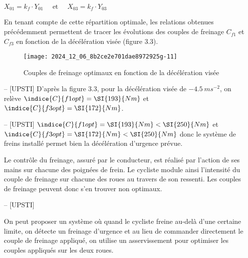 $
X_{01}=k_{f} \cdot Y_{01} \quad \text { et } \quad X_{03}=k_{f} \cdot Y_{03}
$

En tenant compte de cette répartition optimale, les relations obtenues précédemment permettent de tracer les évolutions des couples de freinage \(C_{f 1}\) et \(C_{f 3}\) en fonction de la décélération visée (figure 3.3).\\

\begin{figure}[!htb]
\begin{center}
\texttt{[image: 2024\_12\_06\_8b2ce2e701dae8972925g-11]}
\caption{Couples de freinage optimaux en fonction de la décélération visée \label{fig6}}
\end{center}
\end{figure}
\fi

\ifprof
\begin{corrige}-- [UPSTI]
D’après la figure 3.3, pour la décélération visée de $\SI{-4,5}{m s^{-2}}$, on relève $\indice{C}{f1opt}=\SI{193}{Nm}$ et 
$\indice{C}{f3opt}=\SI{172}{Nm}$.
\end{corrige}
\else
\fi

\ifprof
\begin{corrige}-- [UPSTI]
$\indice{C}{f1opt}=  \SI{193}{Nm}<\SI{250}{Nm}$ et $\indice{C}{f3opt}=\SI{172}{Nm}<\SI{250}{Nm}$ donc le système de freins installé permet bien la décélération d’urgence prévue.
\end{corrige}
\else
\fi

Le contrôle du freinage, assuré par le conducteur, est réalisé par l'action de ses mains sur chacune des poignées de frein. Le cycliste module ainsi l'intensité du couple de freinage sur chacune des roues au travers de son ressenti. Les couples de freinage peuvent donc s'en trouver non optimaux.

\ifprof
\begin{corrige}-- [UPSTI]

On peut proposer un système où quand le cycliste freine au-delà d’une certaine limite, on détecte un freinage d’urgence et au lieu de commander directement le couple de freinage appliqué, on utilise un asservissement pour optimiser les couples appliqués sur les deux roues.

\end{corrige}
\else
\fi


